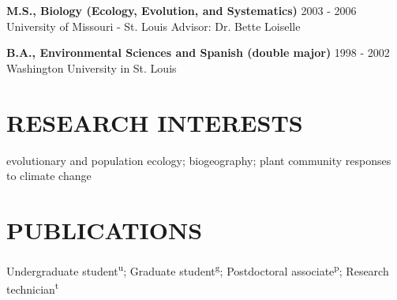 \documentclass[11pt,english]{article}\usepackage[]{graphicx}\usepackage[]{xcolor}
\begin{document}
\begin{flushleft}
{\bf M.S., Biology (Ecology, Evolution, and Systematics)} \hfill {2003 - 2006} \newline
University of Missouri - St. Louis \newline
Advisor: Dr. Bette Loiselle
\vspace{0.5ex}

{\bf B.A., Environmental Sciences and Spanish (double major)} \hfill {1998 - 2002} \newline
Washington University in St. Louis
\end{flushleft}



\section*{RESEARCH INTERESTS}
\vspace{-0.5ex}

evolutionary and population ecology; biogeography; plant community responses to climate change


\vspace{1ex}
\section*{PUBLICATIONS}
\vspace{-0.5ex}

Undergraduate student\textsuperscript{u}; Graduate student\textsuperscript{g}; Postdoctoral associate\textsuperscript{p}; Research technician\textsuperscript{t} 
\end{document}
